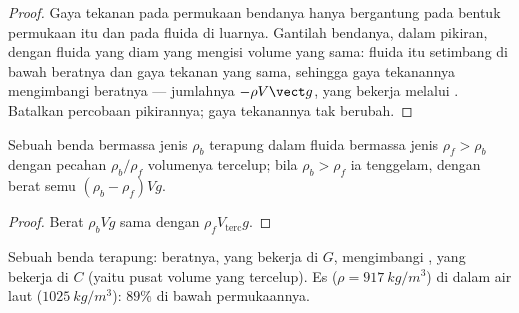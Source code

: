 \begin{proof}
Gaya tekanan pada permukaan bendanya hanya bergantung pada bentuk
permukaan itu dan pada fluida di luarnya. Gantilah bendanya, dalam pikiran, dengan
fluida yang diam yang mengisi volume yang sama: fluida itu setimbang
di bawah beratnya dan gaya tekanan yang sama, sehingga gaya tekanannya
mengimbangi beratnya --- jumlahnya $-\rho V\vect g$, yang bekerja melalui
. Batalkan percobaan pikirannya; gaya tekanannya tak
berubah.
\end{proof}

\begin{corollary}[Terapung]\label{cor:b1:fluid-statics:floating}
Sebuah benda bermassa jenis $\rho_b$ terapung dalam fluida bermassa jenis $\rho_f > \rho_b$
dengan pecahan $\rho_b/\rho_f$ volumenya tercelup; bila $\rho_b >
\rho_f$ ia tenggelam, dengan berat semu $(\rho_b - \rho_f)Vg$.
\end{corollary}

\begin{proof}
Berat $\rho_bVg$ sama dengan  $\rho_fV_{\text{terc}}g$.
\end{proof}

\begin{omfigure}

{\small Sebuah benda terapung: beratnya, yang bekerja di  $G$,
mengimbangi , yang bekerja di  $C$ (yaitu
pusat volume yang tercelup). Es ($\rho = \qty{917}{kg/m^3}$) di dalam air
laut ($\qty{1025}{kg/m^3}$): $89\%$ di bawah permukaannya.}
\end{omfigure}

